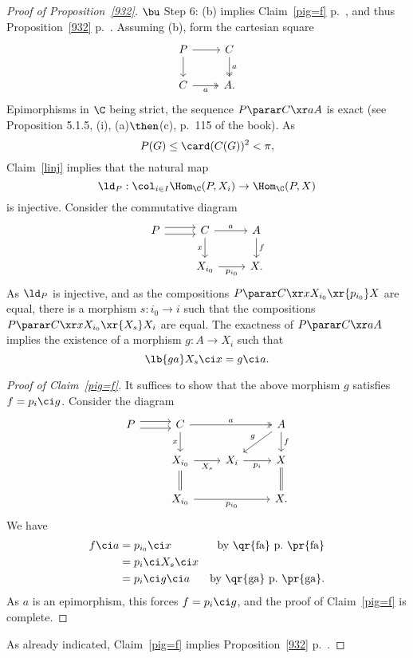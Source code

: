 \documentclass[12pt]{article}
\theoremstyle{remark}
\theoremstyle{definition}
\begin{document}
\begin{proof}[Proof of Proposition~\ref{932}]
\nn$\bu$ Step 6: (b) implies Claim~\ref{pig=f} p.~, and thus Proposition~\ref{932} p.~. Assuming (b), form the cartesian square 
$$
\begin{tikzcd}
P\ar{r}\ar{d}&C\ar[two heads]{d}{a}\\ 
C\ar[two heads]{r}[swap]{a}&A.
\end{tikzcd}
$$
Epimorphisms in $\C$ being strict, the sequence $P\parar C\xr aA$ is exact (see Proposition 5.1.5, (i), (a)$\then$(c), p.~115 of the book). As 
$$
P(G)\le\card(C(G))^2<\pi,
$$ 
Claim~\ref{linj} implies that the natural map 
$$
\ld_P:\col_{i\in I}\Hom_\C(P,X_i)\to\Hom_\C(P,X)
$$ 
is injective. Consider the commutative diagram 
$$
\begin{tikzcd}
P\ar[yshift=0.7ex]{r}\ar[yshift=-0.7ex]{r}&C\ar{r}{a}\ar{d}[swap]{x}&A\ar{d}{f}\\ 
{}&X_{i_0}\ar{r}[swap]{p_{i_0}}&X.
\end{tikzcd}
$$ 
As $\ld_P$ is injective, and as the compositions $P\parar C\xr xX_{i_0}\xr{p_{i_0}}X$ are equal, there is a morphism $s:i_0\to i$ such that the compositions $P\parar C\xr xX_{i_0}\xr{X_s} X_i$ are equal. The exactness of $P\parar C\xr aA$ implies the existence of a morphism $g:A\to X_i$ such that 
\begin{equation}\lb{ga}
X_s\ci x=g\ci a.
\end{equation}

\begin{proof}[Proof of Claim~\ref{pig=f}]
It suffices to show that the above morphism $g$ satisfies $f=p_i\ci g$. Consider the diagram 
$$
\begin{tikzcd}
P\ar[yshift=0.7ex]{r}\ar[yshift=-0.7ex]{r}&C\ar{d}[swap]{x}\ar[two heads]{rr}{a}&&A\ar{dl}[swap]{g}\ar{d}{f}\\ 
{}&X_{i_0}\ar{r}[swap]{X_s}\ar[equal]{d}&X_i\ar{r}[swap]{p_i}&X\ar[equal]{d}\\ 
{}&X_{i_0}\ar{rr}[swap]{p_{i_0}}&&X.
\end{tikzcd}
$$ 
We have 
\begin{align*}
f\ci a&=p_{i_0}\ci x&\text{by \qr{fa} p.~\pr{fa}}\\ 
&=p_i\ci X_s\ci x\\ 
&=p_i\ci g\ci a&\text{by \qr{ga} p.~\pr{ga}}.
\end{align*} 
As $a$ is an epimorphism, this forces $f=p_i\ci g$, and the proof of Claim~\ref{pig=f} is complete. 
\end{proof} 

As already indicated, Claim~\ref{pig=f} implies Proposition~\ref{932} p.~. 
\end{proof}  
\end{document}
